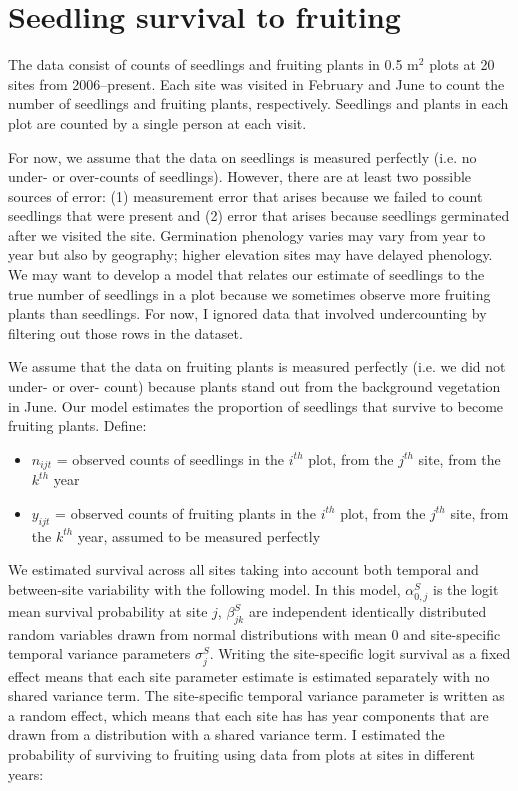 \documentclass[12pt, oneside, titlepage]{article}   	%
\begin{document}
\section*{Seedling survival to fruiting}

The data consist of counts of seedlings and fruiting plants in 0.5 m$^2$ plots at 20 sites from 2006--present. Each site was visited in February and June to count the number of seedlings and fruiting plants, respectively. Seedlings and plants in each plot are counted by a single person at each visit. 

For now, we assume that the data on seedlings is measured perfectly (i.e. no under- or over-counts of seedlings). However, there are at least two possible sources of error: (1) measurement error that arises because we failed to count seedlings that were present and (2) error that arises because seedlings germinated after we visited the site. Germination phenology varies may vary from year to year but also by geography; higher elevation sites may have delayed phenology. We may want to develop a model that relates our estimate of seedlings to the true number of seedlings in a plot because we sometimes observe more fruiting plants than seedlings. For now, I ignored data that involved undercounting by filtering out those rows in the dataset.

We assume that the data on fruiting plants is measured perfectly (i.e. we did not under- or over- count) because plants stand out from the background vegetation in June. Our model estimates the proportion of seedlings that survive to become fruiting plants. Define:

\begin{itemize}
	\item $n_{ijt}$ = observed counts of seedlings in the $i^{th}$ plot, from the $j^{th}$ site, from the $k^{th}$ year
	\item $y_{ijt}$ = observed counts of fruiting plants in the $i^{th}$ plot, from the $j^{th}$ site, from the $k^{th}$ year, assumed to be measured perfectly
\end{itemize}

We estimated survival across all sites taking into account both temporal and between-site variability with the following model. In this model, $\alpha^S_{0,j}$ is the logit mean survival probability at site $j$, $\beta^S_{jk}$ are independent identically distributed random variables drawn from normal distributions with mean 0 and site-specific temporal variance parameters $\sigma_j^S$. Writing the site-specific logit survival as a fixed effect means that each site parameter estimate is estimated separately with no shared variance term. The site-specific temporal variance parameter is written as a random effect, which means that each site has has year components that are drawn from a distribution with a shared variance term. I estimated the probability of surviving to fruiting using data from plots at sites in different years:
\end{document}
